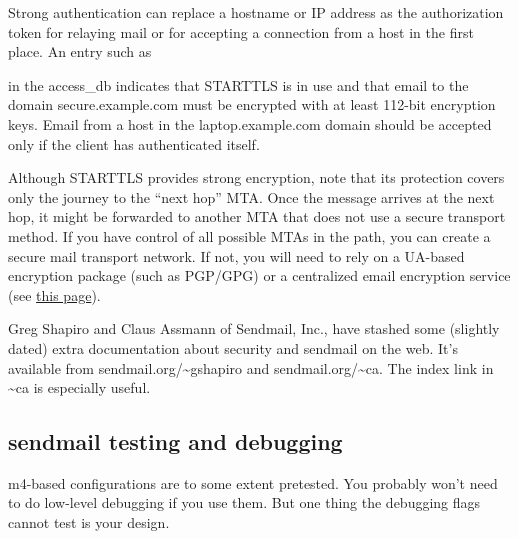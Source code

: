 Strong authentication can replace a hostname or IP address as the
authorization token for relaying mail or for accepting a connection from
a host in the first place. An entry such as


in the {access\_db} indicates that STARTTLS is in use and that email to
the domain secure.example.com must be encrypted with at least 112-bit
encryption keys. Email from a host in the laptop.example.com domain
should be accepted only if the client has authenticated itself.

Although STARTTLS provides strong encryption, note that its protection
covers only the journey to the ``next hop'' MTA. Once the message
arrives at the next hop, it might be forwarded to another MTA that does
not use a secure transport method. If you have control of all possible
MTAs in the path, you can create a secure mail transport network. If
not, you will need to rely on a UA-based encryption package (such as
PGP/GPG) or a centralized email encryption service (see
\protect\hyperlink{part0026_split_017.htmlux5cux23_idTextAnchor1028}{this
page}).

\protect\hypertarget{part0026_split_038.htmlux5cux23_idIndexMarker2599}{}{}Greg
Shapiro and
\protect\hypertarget{part0026_split_038.htmlux5cux23_idIndexMarker2600}{}{}Claus
Assmann of Sendmail, Inc., have stashed some (slightly dated) extra
documentation about security and {sendmail} on the web. It's available
from sendmail.org/\textasciitilde gshapiro and
sendmail.org/\textasciitilde ca. The {index} link in \textasciitilde ca
is especially useful.

\protect\hypertarget{part0026_split_039.html}{}{}

\hypertarget{part0026_split_039.htmlux5cux23_idContainer1247}{}
\hypertarget{part0026_split_039.htmlux5cux23calibre_pb_38}{%
\subsection[ testing and
debugging]{\texorpdfstring{{\protect\hypertarget{part0026_split_039.htmlux5cux23_idTextAnchor1115}{}{}sendmail}
testing and
debugging}{sendmail testing and debugging}}\label{part0026_split_039.htmlux5cux23calibre_pb_38}}

\protect\hypertarget{part0026_split_039.htmlux5cux23_idIndexMarker2601}{}{}\protect\hypertarget{part0026_split_039.htmlux5cux23_idIndexMarker2602}{}{}{\protect\hypertarget{part0026_split_039.htmlux5cux23_idTextAnchor1116}{}{}m4}-based
configurations are to some extent pretested. You probably won't need to
do low-level debugging if you use them. But one thing the debugging
flags cannot
t\protect\hypertarget{part0026_split_039.htmlux5cux23_idTextAnchor1117}{}{}est
is your design.

